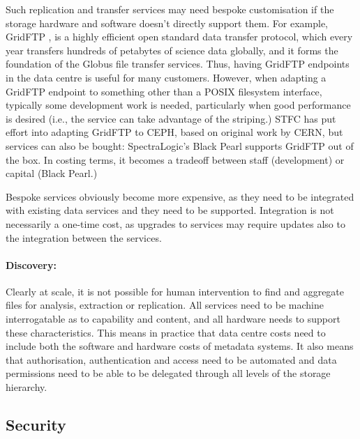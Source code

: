 Such replication and transfer services may need bespoke customisation if the
storage hardware and software doesn't directly support them. For example,
GridFTP \cite{GridFTP}, is a highly efficient open standard data
transfer protocol, which every year transfers hundreds of petabytes of science
data globally, and it forms the foundation of the Globus file transfer services.
Thus, having GridFTP endpoints in the data centre is useful for many customers.
However, when adapting a GridFTP endpoint to
something other than a POSIX filesystem interface, typically some development
work is needed, particularly when good performance is desired (i.e., the service
can take advantage of the striping.)  STFC has put effort into adapting GridFTP
to CEPH, based on original work by CERN, but services can also be bought:
SpectraLogic's Black Pearl supports GridFTP out of the box.  In costing terms,
it becomes a tradeoff between staff (development) or capital (Black Pearl.)

Bespoke services obviously become more expensive, as they need to be integrated
with existing data services and they need to be supported.  Integration is not
necessarily a one-time cost, as upgrades to services may require updates also to
the integration between the services.

\paragraph{Discovery:} Clearly at scale, it is not possible for human intervention
to find and aggregate files for analysis, extraction or replication.  All services
need to be machine interrogatable as to capability and content, and all hardware
needs to support these characteristics. This means in practice that data centre
costs need to include both the software and hardware costs of metadata systems.
It also means that authorisation, authentication and access need to be automated
and data permissions need to be able to be delegated through all levels of the
storage hierarchy.


\subsection{Security}

